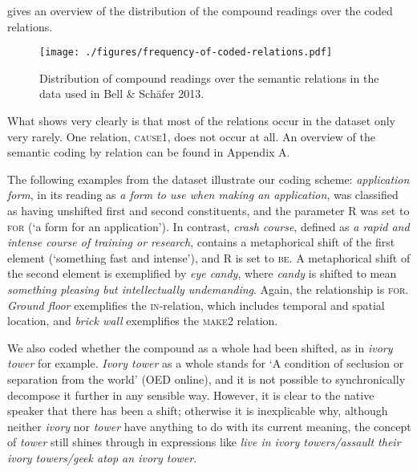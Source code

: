  gives an overview of the
distribution of the compound readings over the coded relations.
\begin{figure}[!htb]
  \centering
\texttt{[image: ./figures/frequency-of-coded-relations.pdf]}
  
  \caption{Distribution of compound readings over the semantic
    relations in the
    data used in Bell \& Schäfer 2013.}
  \label{fig:number-of-coded-relations}
\end{figure}
What  shows very clearly is that most of the relations
occur in the dataset only very rarely. One relation, \textsc{cause1},
does not occur at all. An overview of the semantic coding by relation
can be found in Appendix A.%


The following examples from the dataset illustrate our coding scheme:
\emph{application form}, in its reading as \emph{a form to use when making an application}, was classified as having unshifted first and second
constituents, and the parameter R was set to \textsc{for} (`a form for an application').
In contrast, \emph{crash course}, defined as \emph{a rapid and intense course of training or research}, contains a metaphorical shift of the
first element (`something fast and intense'), and R is set to \textsc{be}. A
metaphorical shift of the second element is exemplified by \emph{eye
  candy}, where \emph{candy} is shifted to mean \emph{something
  pleasing but intellectually undemanding}. Again, the relationship is \textsc{for}. \emph{Ground
  floor} exemplifies the \textsc{in}-relation, which includes temporal and spatial location, and \emph{brick wall}
exemplifies the \textsc{make2} relation.

We also coded whether the compound as a whole had been shifted, as in \emph{ivory tower} for example. \emph{Ivory tower} as a whole stands for `A
condition of seclusion or separation from the world' (OED online), and it is not possible
to synchronically decompose it further in any sensible way. However, it is
clear to the native speaker that there has been a shift; otherwise it
is inexplicable why, although neither \emph{ivory} nor \emph{tower} have anything to do
with its current meaning, the concept of \emph{tower} still shines
through in expressions like \emph{live in ivory towers/assault their
  ivory towers/geek atop an ivory tower}. 

